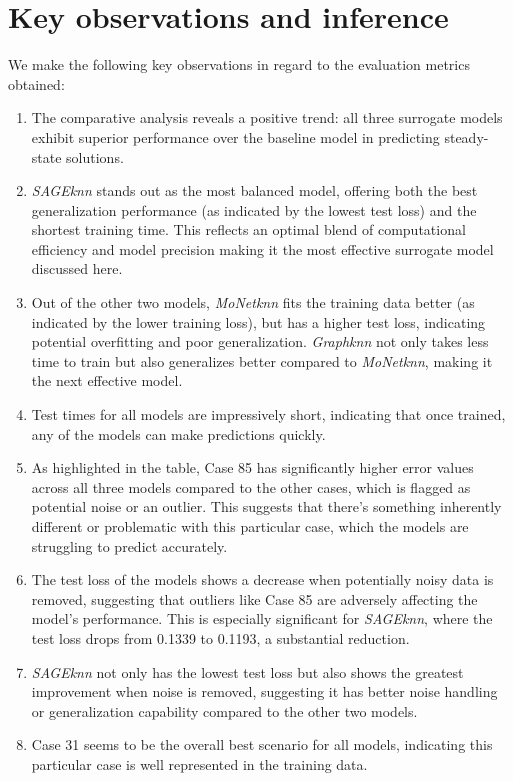 \section{Key observations and inference}
We make the following key observations in regard to the evaluation metrics obtained: 
\begin{enumerate}
    \item  The comparative analysis reveals a positive trend: all three surrogate models exhibit superior performance over the baseline model in predicting steady-state solutions.
    \item \textit{SAGEknn} stands out as the most balanced model, offering both the best generalization performance (as indicated by the lowest test loss) and the shortest training time. This reflects an optimal blend of computational efficiency and model precision making it the most effective surrogate model discussed here.
    \item Out of the other two models, \textit{MoNetknn} fits the training data better (as indicated by the lower training loss), but has a higher test loss, indicating potential overfitting and poor generalization. \textit{Graphknn} not only takes less time to train but also generalizes better compared to \textit{MoNetknn}, making it the next effective model.
    \item Test times for all models are impressively short, indicating that once trained, any of the models can make predictions quickly.
    \item As highlighted in the table, Case 85 has significantly higher error values across all three models compared to the other cases, which is flagged as potential noise or an outlier. This suggests that there's something inherently different or problematic with this particular case, which the models are struggling to predict accurately.
    \item The test loss of the models shows a decrease when potentially noisy data is removed, suggesting that outliers like Case 85 are adversely affecting the model's performance. This is especially significant for \textit{SAGEknn}, where the test loss drops from 0.1339 to 0.1193, a substantial reduction.
    \item \textit{SAGEknn} not only has the lowest test loss but also shows the greatest improvement when noise is removed, suggesting it has better noise handling or generalization capability compared to the other two models. 
    \item Case 31 seems to be the overall best scenario for all models, indicating this particular case is well represented in the training data.
\end{enumerate}
